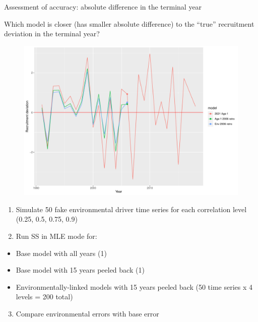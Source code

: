 \documentclass[
  ignorenonframetext,
]{beamer}
\providecommand{\tightlist}{%
  \setlength{\itemsep}{0pt}\setlength{\parskip}{0pt}}\usepackage{longtable,booktabs,array}
\begin{document}
\begin{frame}
Assessment of accuracy: absolute difference in the terminal year

Which model is closer (has smaller absolute difference) to the ``true''
recruitment deviation in the terminal year?

\begin{figure}

{\centering \includegraphics{presentation_files/figure-beamer/unnamed-chunk-2-1.pdf}

}

\end{figure}
\end{frame}

\begin{frame}
\begin{enumerate}
\tightlist
\item
  Simulate 50 fake environmental driver time series for each correlation
  level (0.25, 0.5, 0.75, 0.9)
\end{enumerate}

\pause

\begin{enumerate}
\setcounter{enumi}{1}
\tightlist
\item
  Run SS in MLE mode for:
\end{enumerate}

\begin{itemize}
\item
  Base model with all years (1)
\item
  Base model with 15 years peeled back (1)
\item
  Environmentally-linked models with 15 years peeled back (50 time
  series x 4 levels = 200 total)
\end{itemize}

\pause

\begin{enumerate}
\setcounter{enumi}{2}
\tightlist
\item
  Compare environmental errors with base error
\end{enumerate}
\end{frame}
\end{document}
